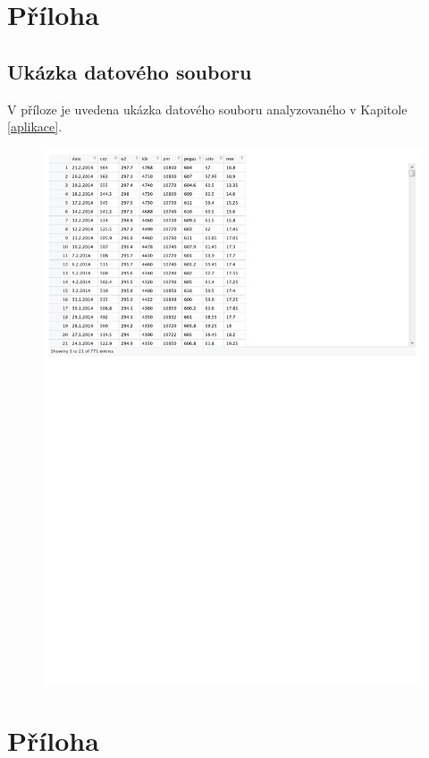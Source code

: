 \documentclass[a4paper,12pt]{report}
\theoremstyle{definition} \newtheorem{definice}[veta]{Definice}
\theoremstyle{remark}
\begin{document}
\chapter[Příloha -- Ukázka datového souboru]{Příloha}\label{priloha_programy}
\section*{Ukázka datového souboru}
V příloze je uvedena ukázka datového souboru analyzovaného v Kapitole \ref{aplikace}.
\begin{figure}[!htbp]
  \centering 
\includegraphics[width=12.5cm, clip, trim= 0 510 277 10]{IMG/data_v2.pdf}
\end{figure}

\chapter[Příloha -- Ukázka programů]{Příloha}
\end{document}
